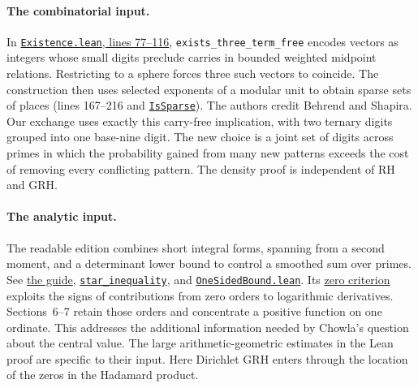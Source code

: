 \documentclass[11pt,letterpaper]{article}
\theoremstyle{definition}\newtheorem{definition}[theorem]{Definition}
\newcommand{\grhfile}[2]{\href{https://github.com/lsernau/grh-lean/blob/72fead102f663d5c7a407964a13dc0cf9d977207/grh/#1}{#2}}
\begin{document}
\paragraph{The combinatorial input.}
In \grhfile{src/New/Reduction/Data/Existence.lean}{\texttt{Existence.lean}, lines 77--116}, \texttt{exists\_three\_term\_free} encodes vectors as integers whose small digits preclude carries in bounded weighted midpoint relations. Restricting to a sphere forces three such vectors to coincide. The construction then uses selected exponents of a modular unit to obtain sparse sets of places (lines 167--216 and \grhfile{src/New/Reduction/Data/AdmissibleData.lean}{\texttt{IsSparse}}). The authors credit Behrend and Shapira. Our exchange uses exactly this carry-free implication, with two ternary digits grouped into one base-nine digit. The new choice is a joint set of digits across primes in which the probability gained from many new patterns exceeds the cost of removing every conflicting pattern. The density proof is independent of RH and GRH.

\paragraph{The analytic input.}
The readable edition combines short integral forms, spanning from a second moment, and a determinant lower bound to control a smoothed sum over primes. See \grhfile{GUIDE.md}{the guide}, \grhfile{src/New/Reduction/MainInequality.lean}{\texttt{star\_inequality}}, and \grhfile{src/New/Reduction/OneSidedBound.lean}{\texttt{OneSidedBound.lean}}. Its \grhfile{src/New/Reduction/Zeros/Criterion.lean}{zero criterion} exploits the signs of contributions from zero orders to logarithmic derivatives. Sections~6--7 retain those orders and concentrate a positive function on one ordinate. This addresses the additional information needed by Chowla's question about the central value. The large arithmetic-geometric estimates in the Lean proof are specific to their input. Here Dirichlet GRH enters through the location of the zeros in the Hadamard product.
\end{document}
